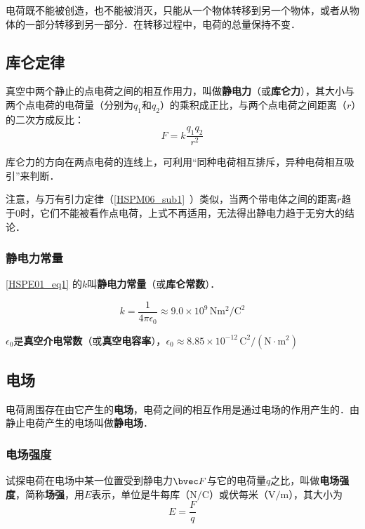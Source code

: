 电荷既不能被创造，也不能被消灭，只能从一个物体转移到另一个物体，或者从物体的一部分转移到另一部分．在转移过程中，电荷的总量保持不变．

\subsection{库仑定律}

真空中两个静止的点电荷之间的相互作用力，叫做\textbf{静电力}（或\textbf{库仑力}），其大小与两个点电荷的电荷量（分别为$q_1$和$q_2$）的乘积成正比，与两个点电荷之间距离（$r$）的二次方成反比：
\begin{equation}\label{HSPE01_eq1}
F=k \frac{q_1 q_2}{r^2}
\end{equation}

库仑力的方向在两点电荷的连线上，可利用“同种电荷相互排斥，异种电荷相互吸引”来判断．

注意，与万有引力定律（\autoref{HSPM06_sub1}~）类似，当两个带电体之间的距离$r$趋于$0$时，它们不能被看作点电荷，上式不再适用，无法得出静电力趋于无穷大的结论．

\subsubsection{静电力常量}

\autoref{HSPE01_eq1} 的$k$叫\textbf{静电力常量}（或\textbf{库仑常数}）．

\begin{equation}
k = \frac{1}{4\pi\epsilon_0} \approx 9.0 \times 10^{9} \,\mathrm{N m^2/C^2}
\end{equation}

$\epsilon_0$是\textbf{真空介电常数}（或\textbf{真空电容率}），$\epsilon_0 \approx 8.85 \times 10^{-12}  \,\mathrm{C^2/(N \cdot m^2)}$

\subsection{电场}

电荷周围存在由它产生的\textbf{电场}，电荷之间的相互作用是通过电场的作用产生的．由静止电荷产生的电场叫做\textbf{静电场}．

\subsubsection{电场强度}

试探电荷在电场中某一位置受到静电力$\bvec F$与它的电荷量$q$之比，叫做\textbf{电场强度}，简称\textbf{场强}，用$E$表示，单位是牛每库（$\mathrm{N/C}$）或伏每米（$\mathrm{V/m}$），其大小为
\begin{equation}\label{HSPE01_eq2}
E =\frac {F}{q}
\end{equation}

